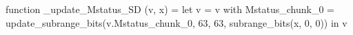function _update_Mstatus_SD (v, x) = let v = { v with Mstatus_chunk_0 = update_subrange_bits(v.Mstatus_chunk_0, 63, 63, subrange_bits(x, 0, 0)) } in
  v
